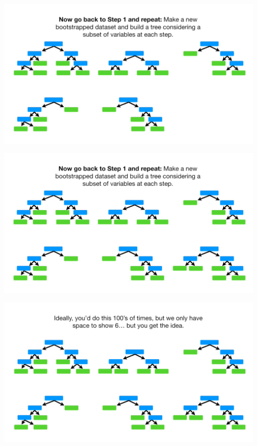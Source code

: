 \documentclass[
  ignorenonframetext,
]{beamer}
\begin{document}
\begin{frame}{}
\protect\hypertarget{section-41}{}
\includegraphics{images/r42.png}
\end{frame}

\begin{frame}{}
\protect\hypertarget{section-42}{}
\includegraphics{images/r43.png}
\end{frame}

\begin{frame}{}
\protect\hypertarget{section-43}{}
\includegraphics{images/r44.png}
\end{frame}
\end{document}
